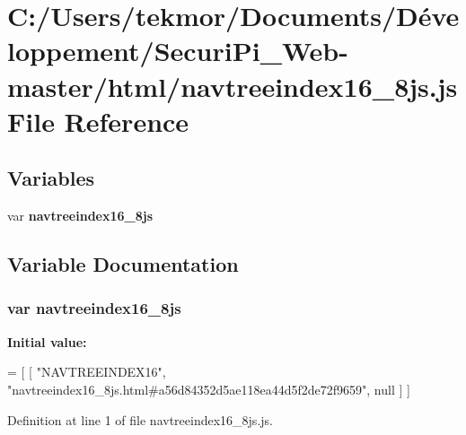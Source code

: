 \section{C\+:/\+Users/tekmor/\+Documents/\+Développement/\+Securi\+Pi\+\_\+\+Web-\/master/html/navtreeindex16\+\_\+8js.js File Reference}
\label{navtreeindex16__8js_8js}
\subsection*{Variables}
\begin{DoxyCompactItemize}
\item 
var {\bf navtreeindex16\+\_\+8js}
\end{DoxyCompactItemize}


\subsection{Variable Documentation}
\subsubsection[{navtreeindex16\+\_\+8js}]{\setlength{\rightskip}{0pt plus 5cm}var navtreeindex16\+\_\+8js}\label{navtreeindex16__8js_8js_a230be87b2b4a1e70dfd6ef699caf9957}
{\bfseries Initial value\+:}
\begin{DoxyCode}
=
[
    [ \textcolor{stringliteral}{"NAVTREEINDEX16"}, \textcolor{stringliteral}{"navtreeindex16\_8js.html#a56d84352d5ae118ea44d5f2de72f9659"}, null ]
]
\end{DoxyCode}


Definition at line 1 of file navtreeindex16\+\_\+8js.\+js.

